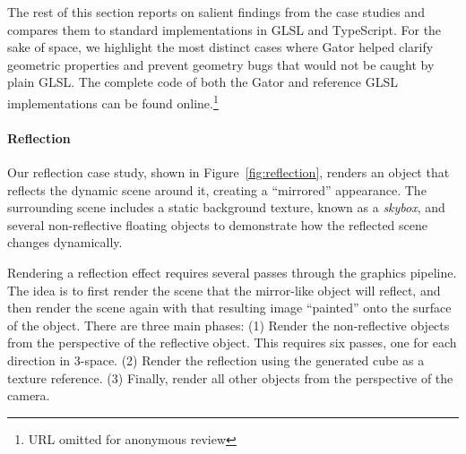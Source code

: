{The rest of this section reports on salient findings from the case studies and compares them to standard implementations in GLSL and TypeScript.
For the sake of space, we highlight the most distinct cases where Gator helped clarify geometric properties and prevent geometry bugs that would not be caught by plain GLSL.  The complete code of both the Gator and reference GLSL implementations can be found online.\footnote{URL omitted for anonymous review}

\paragraph{Reflection}

Our reflection case study, shown in Figure~\ref{fig:reflection}, renders an object that reflects the dynamic scene around it, creating a ``mirrored'' appearance.
The surrounding scene includes a static background texture, known as a \emph{skybox}, and several non-reflective floating objects to demonstrate how the reflected scene changes dynamically.

Rendering a reflection effect requires several passes through the graphics pipeline.
The idea is to first render the scene that the mirror-like object will reflect, and then render the scene again with that resulting image ``painted'' onto the surface of the object.
There are three main phases:
(1) Render the non-reflective objects from the perspective of the reflective object.
This requires six passes, one for each direction in 3-space.
(2) Render the reflection using the generated cube as a texture reference.
(3) Finally, render all other objects from the perspective of the camera.

}
